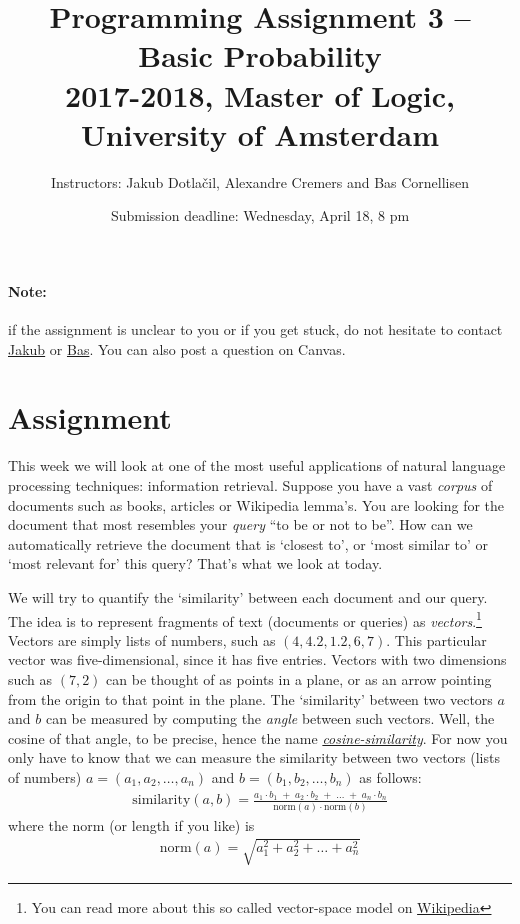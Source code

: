 \documentclass[11pt, a4paper]{article}
\title{Programming Assignment 3 -- Basic Probability \\[2mm]
\large{2017-2018, Master of Logic, University of Amsterdam}}
\author{Instructors: Jakub Dotla\v{c}il, Alexandre Cremers and Bas Cornellisen}
\date{Submission deadline: Wednesday, April 18, 8 pm}
\begin{document}
\maketitle

\paragraph{Note:} if the assignment is unclear to you or if you get stuck, do not hesitate to contact \href{mailto:j.dotlacil@uva.nl}{Jakub} or \href{mailto:bjmcornelissen@gmail.com}{Bas}. You can also post a question on Canvas.

\section{Assignment}
This week we will look at one of the most useful applications of natural language processing techniques: information retrieval. 
Suppose you have a vast \emph{corpus} of documents such as books, articles or Wikipedia lemma's.
You are looking for the document that most resembles your \emph{query} ``to be or not to be''. 
How can we automatically retrieve the document that is `closest to', or `most similar to' or `most relevant for' this query?
That's what we look at today.



We will try to quantify the `similarity' between each document and our query. 
The idea is to represent fragments of text (documents or queries) as \emph{vectors}.\footnote{You can read more about this so called vector-space model on \href{https://en.wikipedia.org/wiki/Vector_space_model}{Wikipedia}} 
Vectors are simply lists of numbers, such as $(4, 4.2, 1.2, 6, 7)$. 
This particular vector was five-dimensional, since it has five entries. 
Vectors with two dimensions such as $(7, 2)$ can be thought of as points in a plane, or as an arrow pointing from the origin to that point in the plane.
The `similarity' between two vectors $a$ and $b$ can be measured by computing the \emph{angle} between such vectors. 
Well, the cosine of that angle, to be precise, hence the name \emph{\href{https://en.wikipedia.org/wiki/Cosine_similarity}{cosine-similarity}}. 
For now you only have to know that we can measure the similarity between two vectors (lists of numbers) $a=(a_1, a_2, \dots, a_n)$ and $b = (b_1, b_2, \dots, b_n)$ as follows:
\begin{align}
  \text{similarity}(a, b) 
    = \frac{ a_1 \cdot b_1 \;+\; a_2 \cdot b_2 \;+\; \dots \;+\; a_n \cdot b_n}%
      {\text{norm}(a) \cdot \text{norm}(b)}
\end{align}
where the norm (or length if you like) is
\begin{align}
  \text{norm}(a) = \sqrt{a_1^2 + a_2^2 + \dots + a_n^2}
\end{align}
\end{document}
